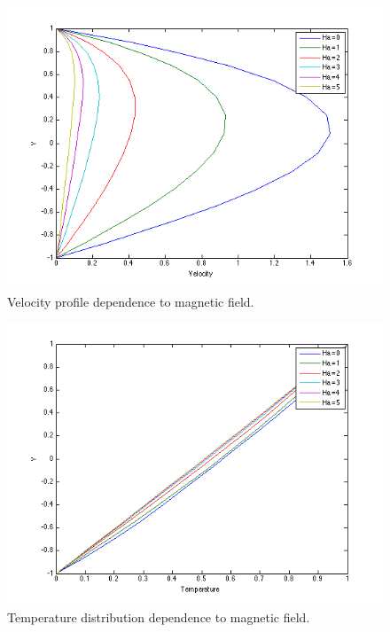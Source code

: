 \begin{figure}
\begin{center}
\includegraphics[scale=0.75]{figures/vel.png}
\end{center}
\caption{Velocity profile dependence to magnetic field.}
\label{velMagDep} 
\end{figure}

\begin{figure}
\begin{center}
\includegraphics[scale=0.75]{figures/temp.png}
\end{center}
\caption{Temperature distribution dependence to magnetic field.}
\label{tempMagDep} 
\end{figure}


